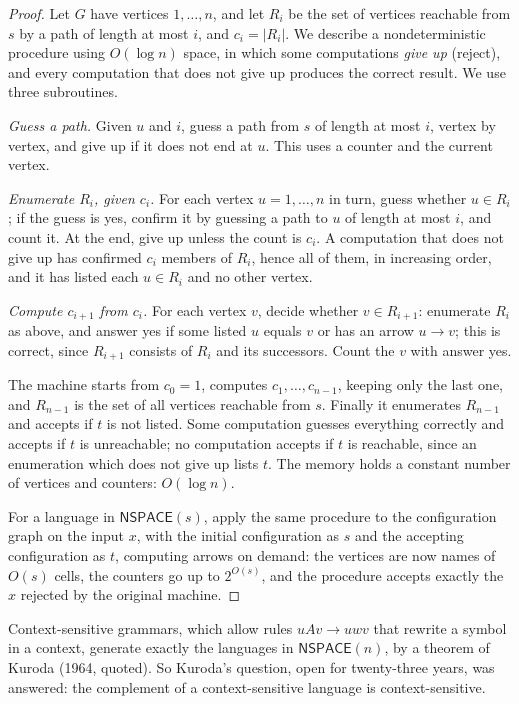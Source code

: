 \begin{proof}
Let $G$ have vertices $1,\dots,n$, and let $R_i$ be the set of vertices reachable from $s$ by a path of length at most $i$, and $c_i=|R_i|$. We describe a nondeterministic procedure using $O(\log n)$ space, in which some computations \emph{give up} (reject), and every computation that does not give up produces the correct result. We use three subroutines.

\emph{Guess a path.} Given $u$ and $i$, guess a path from $s$ of length at most $i$, vertex by vertex, and give up if it does not end at $u$. This uses a counter and the current vertex.

\emph{Enumerate $R_i$, given $c_i$.} For each vertex $u=1,\dots,n$ in turn, guess whether $u\in R_i$; if the guess is yes, confirm it by guessing a path to $u$ of length at most $i$, and count it. At the end, give up unless the count is $c_i$. A computation that does not give up has confirmed $c_i$ members of $R_i$, hence all of them, in increasing order, and it has listed each $u\in R_i$ and no other vertex.

\emph{Compute $c_{i+1}$ from $c_i$.} For each vertex $v$, decide whether $v\in R_{i+1}$: enumerate $R_i$ as above, and answer yes if some listed $u$ equals $v$ or has an arrow $u\to v$; this is correct, since $R_{i+1}$ consists of $R_i$ and its successors. Count the $v$ with answer yes.

The machine starts from $c_0=1$, computes $c_1,\dots,c_{n-1}$, keeping only the last one, and $R_{n-1}$ is the set of all vertices reachable from $s$. Finally it enumerates $R_{n-1}$ and accepts if $t$ is not listed. Some computation guesses everything correctly and accepts if $t$ is unreachable; no computation accepts if $t$ is reachable, since an enumeration which does not give up lists $t$. The memory holds a constant number of vertices and counters: $O(\log n)$.

For a language in $\mathsf{NSPACE}(s)$, apply the same procedure to the configuration graph on the input $x$, with the initial configuration as $s$ and the accepting configuration as $t$, computing arrows on demand: the vertices are now names of $O(s)$ cells, the counters go up to $2^{O(s)}$, and the procedure accepts exactly the $x$ rejected by the original machine.
\end{proof}

Context-sensitive grammars, which allow rules $uAv\to uwv$ that rewrite a symbol in a context, generate exactly the languages in $\mathsf{NSPACE}(n)$, by a theorem of Kuroda (1964, quoted). So Kuroda's question, open for twenty-three years, was answered: the complement of a context-sensitive language is context-sensitive.

